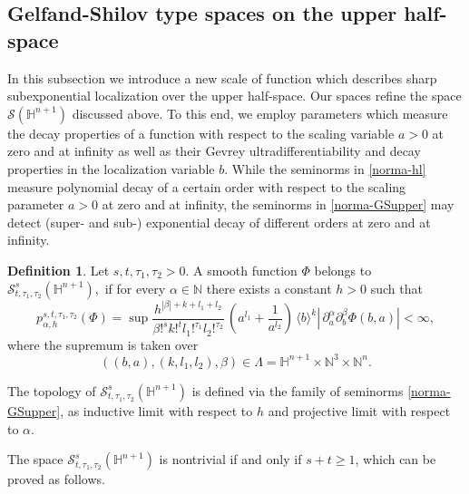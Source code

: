 \documentclass[reqno,12pt]{amsart}
\theoremstyle{plain}
\theoremstyle{definition}
\newtheorem{definition}{Definition}
\theoremstyle{remark}
\begin{document}
\subsection{Gelfand-Shilov type spaces on the upper half-space}\label{G-S upper half-space}
In this subsection we introduce a new scale of function which describes sharp subexponential localization over the upper half-space. Our spaces refine the space $\mathcal{S}(\mathbb{H}^{n+1})$ discussed above. To this end, we employ parameters which measure the decay properties of a function with respect to the scaling variable $a>0$ at zero and at infinity as well
as their Gevrey ultradifferentiability and decay properties in the localization variable $b.$
While the seminorms in \eqref{norma-hl} measure polynomial decay of a certain order with
respect to the scaling parameter $a>0$ at zero and at infinity,
the seminorms in  \eqref{norma-GSupper}
may detect (super- and sub-) exponential decay of different orders at zero and at infinity.

\par

\begin{definition} \label{upper-half-space}
Let $ s, t, \tau_1, \tau_2 > 0 $.
A smooth function $ \Phi $ belongs to $ \mathcal{S}^{s}_{t, \tau_1, \tau_2}
(\mathbb{H}^{n+1}), $  if for every $\alpha \in \mathbb{N} $
there exists a constant $h>0$
such that
\begin{equation} \label{norma-GSupper}
p_{\alpha, h}^{s, t, \tau_1, \tau_2} (\Phi) = \sup
\frac{h^{|\beta| + k + l_1 + l_2}}{\beta!^{s} k!^{t} l_1!^{\tau_1}
l_2!^{\tau_2}} \, \left(a^{l_1} + \frac{1}{a^{l_2}}\right) \,
\langle b \rangle^k\left|  \, \partial_a^{\alpha}
\partial_b^{\beta} \Phi (b, a) \right| < \infty,
\end{equation}
where the supremum is taken over
$$ ((b, a), (k, l_1, l_2), \beta) \in \Lambda = \mathbb{H}^{n+1} \times \mathbb{N}^3 \times
\mathbb{N}^n.
$$
\end{definition}

\par

The topology of $ \mathcal{S}^{s}_{t,\tau_1, \tau_2}
(\mathbb{H}^{n+1}) $ is defined via the family of seminorms
\eqref{norma-GSupper}, as inductive limit with respect to $h$ and projective limit with respect to $\alpha$.

The space $ \mathcal{S}^{s}_{t,\tau_1, \tau_2} (\mathbb{H}^{n+1}) $ is
nontrivial if and only if $ s+ t \geq 1$, which can be proved as follows.
\end{document}
